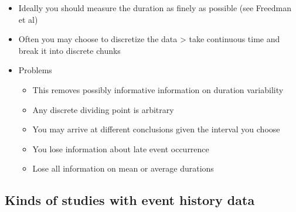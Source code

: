 \documentclass[
]{article}
\providecommand{\tightlist}{%
  \setlength{\itemsep}{0pt}\setlength{\parskip}{0pt}}
\begin{document}
\begin{itemize}
\item
  Ideally you should measure the duration as finely as possible (see Freedman et al)
\item
  Often you may choose to discretize the data \textgreater{} take continuous time and break it into discrete chunks
\item
  Problems

  \begin{itemize}
  \tightlist
  \item
    This removes possibly informative information on duration variability
  \item
    Any discrete dividing point is arbitrary
  \item
    You may arrive at different conclusions given the interval you choose
  \item
    You lose information about late event occurrence
  \item
    Lose all information on mean or average durations
  \end{itemize}
\end{itemize}

\hypertarget{kinds-of-studies-with-event-history-data}{%
\subsection{Kinds of studies with event history data}\label{kinds-of-studies-with-event-history-data}}
\end{document}
